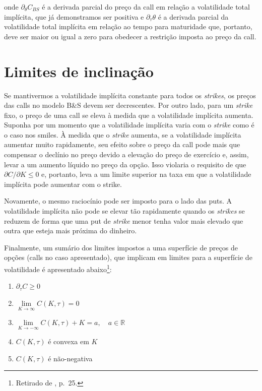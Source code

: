 \documentclass[]{book}
\providecommand{\tightlist}{%
  \setlength{\itemsep}{0pt}\setlength{\parskip}{0pt}}
\let\rmarkdownfootnote\footnote%
\def\footnote{\protect\rmarkdownfootnote}
\begin{document}
onde \(\partial_\theta C_{BS}\) é a derivada parcial do preço da call em
relação a volatilidade total implícita, que já demonstramos ser positiva
e \(\partial_\tau \theta\) é a derivada parcial da volatilidade total
implícita em relação ao tempo para maturidade que, portanto, deve ser
maior ou igual a zero para obedecer a restrição imposta ao preço da
call.

\section{Limites de inclinação}\label{limites-de-inclinacao}

Se mantivermos a volatilidade implícita constante para todos os
\emph{strikes}, os preços das calls no modelo B\&S devem ser
decrescentes. Por outro lado, para um \emph{strike} fixo, o preço de uma
call se eleva à medida que a volatilidade implícita aumenta. Suponha por
um momento que a volatilidade implícita varia com o \emph{strike} como é
o caso nos smiles. À medida que o \emph{strike} aumenta, se a
volatilidade implícita aumentar muito rapidamente, seu efeito sobre o
preço da call pode mais que compensar o declínio no preço devido a
elevação do preço de exercício e, assim, levar a um aumento líquido no
preço da opção. Isso violaria o requisito de que
\(\partial C /\partial K \leq 0\) e, portanto, leva a um limite superior
na taxa em que a volatilidade implícita pode aumentar com o strike.

Novamente, o mesmo raciocínio pode ser imposto para o lado das puts. A
volatilidade implícita não pode se elevar tão rapidamente quando os
\emph{strikes} se reduzem de forma que uma put de \emph{strike} menor
tenha valor mais elevado que outra que esteja mais próxima do dinheiro.

Finalmente, um sumário dos limites impostos a uma superfície de preços
de opções (calls no caso apresentado), que implicam em limites para a
superfície de volatilidade é apresentado abaixo\footnote{Retirado de
  \citet{Aurell2014}, p.~25.}:

\begin{enumerate}
\def\labelenumi{\arabic{enumi}.}
\tightlist
\item
  \(\partial_\tau C \geq 0\)
\item
  \(\lim\limits_{K\rightarrow\infty}C(K, \tau)=0\)
\item
  \(\lim\limits_{K\rightarrow-\infty}C(K, \tau)+K=a, \quad a \in \mathbb R\)
\item
  \(C(K, \tau)\) é convexa em \(K\)
\item
  \(C(K, \tau)\) é não-negativa
\end{enumerate}
\end{document}
